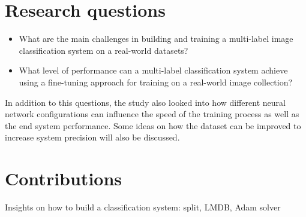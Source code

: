 \section{Research questions}

\begin{itemize}
    \item What are the main challenges in building and training a multi-label image classification system on a real-world datasets?
    \item What level of performance can a multi-label classification system achieve using a fine-tuning approach for training on a real-world image collection?
\end{itemize}

In addition to this questions, the study also looked into how different neural network configurations can influence the speed of the training process as well as the end system performance. Some ideas on how the dataset can be improved to increase system precision will also be discussed.

\section{Contributions}
    Insights on how to build a classification system: split, LMDB, Adam solver